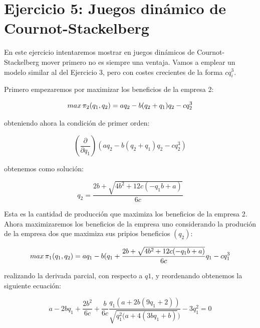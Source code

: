 \documentclass{article}
\begin{document}
\section{Ejercicio 5: Juegos din\'amico de Cournot-Stackelberg}

En este ejercicio intentaremos mostrar en juegos dinámicos de Cournot-Stackelberg mover primero no es siempre una ventaja. Vamos a emplear un modelo similar al del Ejercicio 3, pero con costes crecientes de la forma $cq_i^3$.

\vspace{5mm}

Primero empezaremos por maximizar los beneficios de la empresa 2:

$$max\thinspace \pi_2(q_1,q_2)=aq_2-b(q_2+q_1)q_2-cq^3_2$$

obteniendo ahora la condici\'on de primer orden:

$$(\frac{\partial}{\partial q_1})(aq_2-b(q_2+q_1)q_2-cq^3_2)$$

obtenemos como soluci\'on:

$$q_2=\frac{2b+\sqrt{4b^2+12c(-q_1b+a)}}{6c}$$

Esta es la cantidad de producci\'on que maximiza los beneficios de la empresa 2. Ahora maximizaremos los beneficios de la empresa uno considerando la produci\'on de la empresa dos que maximiza sus pripios beneficios $(q_2)$:

$$max\thinspace \pi_1(q_1,q_2)=aq_1-b(q_1+\frac{2b+\sqrt{4b^2+12c(-q_1b+a)}}{6c}q_1-cq^3_1$$

realizando la derivada parcial, con respecto a $q1$, y reordenando obtenemos la siguiente ecuación:

$$a-2bq_1+\frac{2b^2}{6c}+\frac{b}{6c}\frac{q_1(a+2b(9q_1+2))}{\sqrt{q_1^2(a+4(3bq_1+b)})}-3q_1^2=0$$
\end{document}

